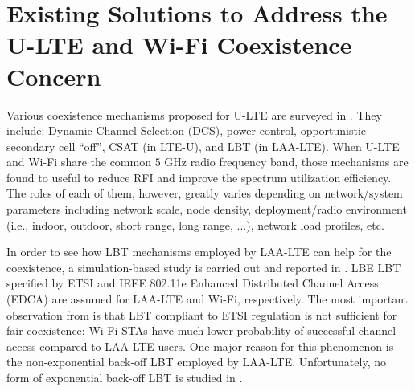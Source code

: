 \section{Existing Solutions to Address the U-LTE and Wi-Fi Coexistence Concern}

Various coexistence mechanisms proposed for U-LTE are surveyed in \cite{U-LTE-survey-2014, U-LTE-survey-2015, U-LTE-5G-2015}. They include: Dynamic Channel Selection (DCS), power control, opportunistic secondary cell ``off'', CSAT (in LTE-U), and LBT (in LAA-LTE). When U-LTE and Wi-Fi share the common $5$ GHz radio frequency band, those mechanisms are found to useful to reduce RFI and improve the spectrum utilization efficiency. The roles of each of them, however, greatly varies depending on network/system parameters including network scale, node density, deployment/radio environment (i.e., indoor, outdoor, short range, long range, ...), network load profiles, etc. 

In order to see how LBT mechanisms employed by LAA-LTE can help for the coexistence, a simulation-based study is carried out and reported in \cite{LBT-CableLabs-2014}. LBE LBT specified by ETSI \cite{LBT-ETSI-2014} and IEEE 802.11e Enhanced Distributed Channel Access (EDCA) are assumed for LAA-LTE and Wi-Fi, respectively. The most important observation from \cite{LBT-CableLabs-2014} is that LBT compliant to ETSI regulation is not sufficient for fair coexistence: Wi-Fi STAs have much lower probability of successful channel access compared to LAA-LTE users. One major reason for this phenomenon is the non-exponential back-off LBT employed by LAA-LTE. Unfortunately, no form of exponential back-off LBT is studied in \cite{LBT-CableLabs-2014}.

